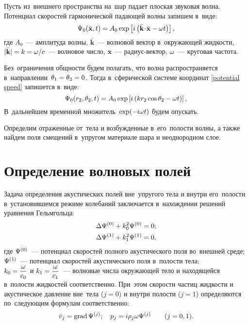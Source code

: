 Пусть из~внешнего пространства на~шар падает плоская звуковая волна. Потенциал скоростей гармонической падающей волны запишем в~виде:
\begin{equation}\label{potential speed}
\P_0(\bar{\mathbf{x}}, t) = A_0 \exp\left[i\left(\bar{\mathbf{k}}\dotm\bar{\mathbf{x}}-\om t\right)\right],
\end{equation}
где $A_0$~--- амплитуда волны, $\bar{\mathbf{k}}$~--- волновой вектор в~окружающей жидкости,  $\lvert\bar{\mathbf{k}}\rvert = k = \om / c$~--- волновое число, $\bar{\mathbf{x}}$~--- радиус-вектор, $\om$~--- круговая частота.

 Без~ограничения общности будем полагать, что волна распространяется в~направлении~$\Q_1 = \Q_2 = 0$. Тогда в~сферической системе координат \eqref{potential speed} запишется в~виде:
\begin{equation}
\P_0(r_2, \Q_2, t) = A_0 \exp\left[i\left(kr_2\cos\Q_2 - \om t\right)\right],
\end{equation}
В~дальнейшем временной множитель~$\exp(-i\om t)$ будем опускать.

Определим отраженные от~тела и возбужденные в~его~полости волны, а также найдем поля смещений в~упругом материале шара и неоднородном слое.

\newpage
\section{Определение волновых полей}
Задача определения акустических полей вне~упругого тела и внутри его~полости в~установившемся режиме колебаний заключается в~нахождении решений уравнения Гельмгольца:
\begin{align}
\Lap\P^{(0)} &+ k_0^2\P^{(0)} = 0;\label{Helmholtz_ambient}\\
\Lap\P^{(1)} &+ k_1^2\P^{(1)} = 0,\label{Helmholtz_hollow}
\end{align}
где $\P^{(0)}$~--- потенциал скоростей полного акустического поля во~внешней среде;\\
$\P^{(1)}$~--- потенциал скоростей акустического поля в~полости тела;\\
$k_0 = \df{\om}{c_0}$ и $k_1 = \df{\om}{c_1}$~--- волновые числа окружающей тело и находящейся в~полости жидкостей соответственно. При~этом скорости частиц жидкости и акустическое давление вне~тела ($j = 0$) и внутри полости ($j = 1$) определяются по~следующим формулам соответственно:
\begin{equation}
\bar{v}_j = \grad\P^{(j)}; \q p_j = i\r_j\om\P^{(j)} \qq (j = 0, 1).
\end{equation}

